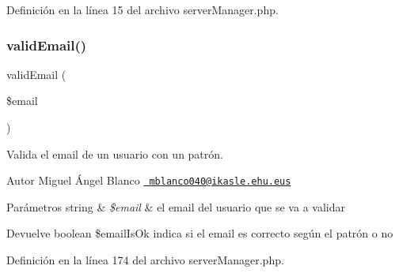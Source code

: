 Definición en la línea 15 del archivo server\+Manager.\+php.

\mbox{\label{server_manager_8php_a73637e760498c5cea55074896ec982ac}} 
\subsubsection{\texorpdfstring{validEmail()}{validEmail()}}
{\footnotesize\ttfamily valid\+Email (\begin{DoxyParamCaption}\item[{}]{\$email }\end{DoxyParamCaption})}

Valida el email de un usuario con un patrón.

\begin{DoxyAuthor}{Autor}
Miguel Ángel Blanco \href{mailto:mblanco040@ikasle.ehu.eus}{\texttt{ mblanco040@ikasle.\+ehu.\+eus}}
\end{DoxyAuthor}

\begin{DoxyParams}[1]{Parámetros}
string & {\em \$email} & el email del usuario que se va a validar\\
\hline
\end{DoxyParams}
\begin{DoxyReturn}{Devuelve}
boolean \$email\+Is\+Ok indica si el email es correcto según el patrón o no 
\end{DoxyReturn}


Definición en la línea 174 del archivo server\+Manager.\+php.

